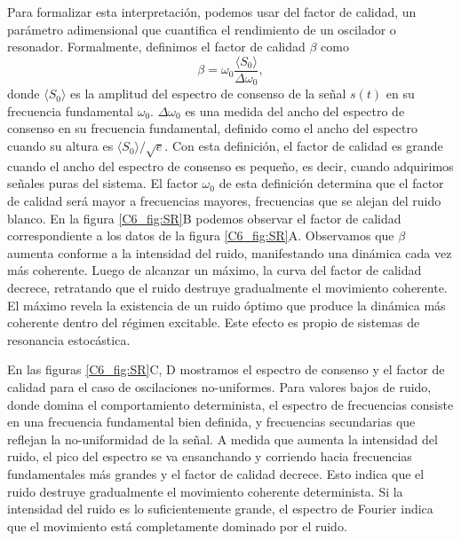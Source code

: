 \documentclass[./main.tex]{subfiles}
\begin{document}
Para formalizar esta interpretación, podemos usar del factor de calidad, un parámetro adimensional que cuantifica el rendimiento de un oscilador o resonador. Formalmente, definimos el factor de calidad $\beta$ como \cite{Ditzinger1994} 
\begin{equation} 
    \beta = \omega_0 \frac{\langle S_0 \rangle}{\Delta  \omega_0},
    \label{C6_eq:QF}
\end{equation}
donde $\langle S_0 \rangle$ es la amplitud del espectro de consenso de la señal $s(t)$ en su frecuencia fundamental $\omega_0$. $\Delta  \omega_0$ es una medida del ancho del espectro de consenso en su frecuencia fundamental, definido como el ancho del espectro cuando su altura es $\langle S_0 \rangle / \sqrt{e}$. Con esta definición, el factor de calidad es grande cuando el ancho del espectro de consenso es pequeño, es decir, cuando adquirimos señales puras del sistema.  El factor $\omega_0$ de esta definición determina que el factor de calidad será mayor a frecuencias mayores, frecuencias que se alejan del ruido blanco. En la figura  \ref{C6_fig:SR}B podemos observar el factor de calidad correspondiente a los datos de la figura \ref{C6_fig:SR}A. Observamos que $\beta$ aumenta conforme a la intensidad del ruido, manifestando una dinámica cada vez más coherente. Luego de alcanzar un máximo, la curva del factor de calidad decrece, retratando que el ruido destruye gradualmente el movimiento coherente. El máximo revela la existencia de un ruido óptimo que produce la dinámica más coherente dentro del régimen excitable. Este efecto es propio de sistemas de resonancia estocástica.


En las figuras \ref{C6_fig:SR}C, D mostramos el espectro de consenso y el factor de calidad para el caso de oscilaciones no-uniformes. Para valores bajos de ruido, donde domina el comportamiento determinista, el espectro de frecuencias consiste en una frecuencia fundamental bien definida, y frecuencias secundarias que reflejan la no-uniformidad de la señal. A medida que aumenta la intensidad del ruido, el pico del espectro se va ensanchando y corriendo hacia frecuencias fundamentales más grandes y el factor de calidad decrece. Esto indica que el ruido destruye gradualmente el movimiento coherente determinista. Si la intensidad del ruido es lo suficientemente grande, el espectro de Fourier indica que el movimiento está completamente dominado por el ruido. 
\end{document}
